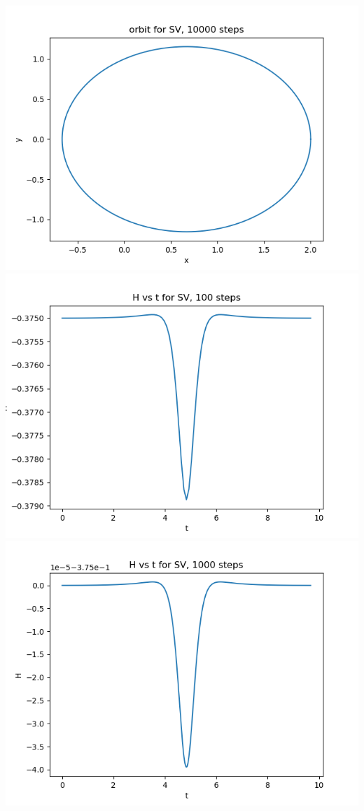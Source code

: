 \documentclass{article}
\begin{document}
\begin{enumerate}
\begin{enumerate}[label=(\alph*)]
\begin{center}
		\includegraphics[scale=.3]{hw5 SV orbit 10000 steps}
		\includegraphics[scale=.3]{hw5 SV ham 100 steps}
		\includegraphics[scale=.3]{hw5 SV ham 1000 steps}

\end{center}
\end{enumerate}
\end{enumerate}
\end{document}
